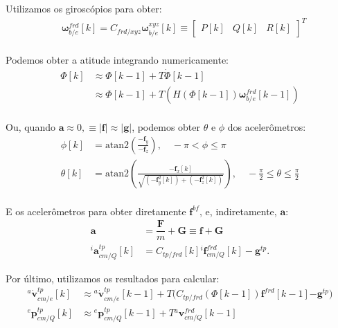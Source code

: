 Utilizamos os giroscópios para obter:
\begin{align*}
     &\mathbf{\omega}^{frd}_{b/e}{\left[k\right]}
     = C_{frd/xyz} \mathbf{\omega}^{xyz}_{b/e}{\left[k\right]}
        \equiv \begin{bmatrix} P{\left[k\right]} & Q{\left[k\right]} & R{\left[k\right]} \end{bmatrix}^{T}
        \text{} \\
\end{align*}

Podemos obter a atitude integrando numericamente:
\begin{align*}
{\Phi}{\left[ k \right]} 
    &\approx {\Phi} {\left[ k-1 \right]} + T {\dot{\Phi}{\left[ k -1 \right]}} \\
    &\approx {\Phi} {\left[ k-1 \right]} + T {\left( H {\left( \Phi{\left[ k-1 \right]} \right)}{\mathbf{\omega}^{frd}_{b/e}}{\left[ k-1 \right]}\right)} \\
\end{align*}

Ou, quando \(\mathbf{a} \approx 0, \equiv \lvert\mathbf{f}\lvert \approx \lvert\mathbf{g}\lvert\), podemos obter \(\theta\) e \(\phi\) dos acelerômetros:
\begin{align*}
    {\phi}\left[k\right] &=  \textrm{atan2}\left(\frac{\mathbf{-f}_{y}}{\mathbf{-f}_{z}}\right),\quad
    -\pi  < \phi \leq \pi \\
    {{\theta}{\left[k\right]}} &= \textrm{atan2} \left( {\frac{-\mathbf{f}_{x}\left[k\right] }{ \sqrt{ {\left({{-\mathbf{f}_{y}^{2}}\left[k\right]}\right)} + {\left({{-\mathbf{f}}_{z}^{2}}{\left[k\right]}\right)}}}} \right), \quad -\frac{\pi}{2} \leq \theta \leq \frac{\pi}{2} \\
\end{align*}

E os acelerômetros para obter diretamente \(\mathbf{f}^{bf}\), e, indiretamente, \(\mathbf{a}\):
\begin{align*}
    \mathbf{a} &= \dfrac{\mathbf{F}}{m} + \mathbf{G} \equiv \mathbf{f} + \mathbf{G} \\
{^{i}\mathbf{a}^{tp}_{cm/Q}\left[k\right]} &= C_{tp/frd}\left[k\right]{^{i}\mathbf{f}^{frd}_{cm/Q}\left[k\right]} - \mathbf{g}^{tp}.
\end{align*}

Por último, utilizamos os resultados para calcular:
\begin{align*}
    {^{a}{\dot{\mathbf{v}}}^{tp}_{cm/e}{\left[k\right]}}
        &\approx {^{a}{\dot{\mathbf{v}}}^{tp}_{cm/e}}{\left[ k-1 \right]}
        + T \Big( {C_{tp/frd}\left({\Phi}{\left[ k-1 \right]} \right)} {{\mathbf{f}}^{frd}\left[k-1\right]} {-{\mathbf{g}}^{tp}} \Big) \\
    {^{e}{\mathbf{p}^{tp}_{cm/Q}}\left[k\right]}
    &\approx     {^{e}{\mathbf{p}^{tp}_{cm/Q}}\left[k-1\right]}
    + T {^{a}\mathbf{v}^{frd}_{cm/Q}{\left[ k-1 \right]}} \\
\end{align*}

